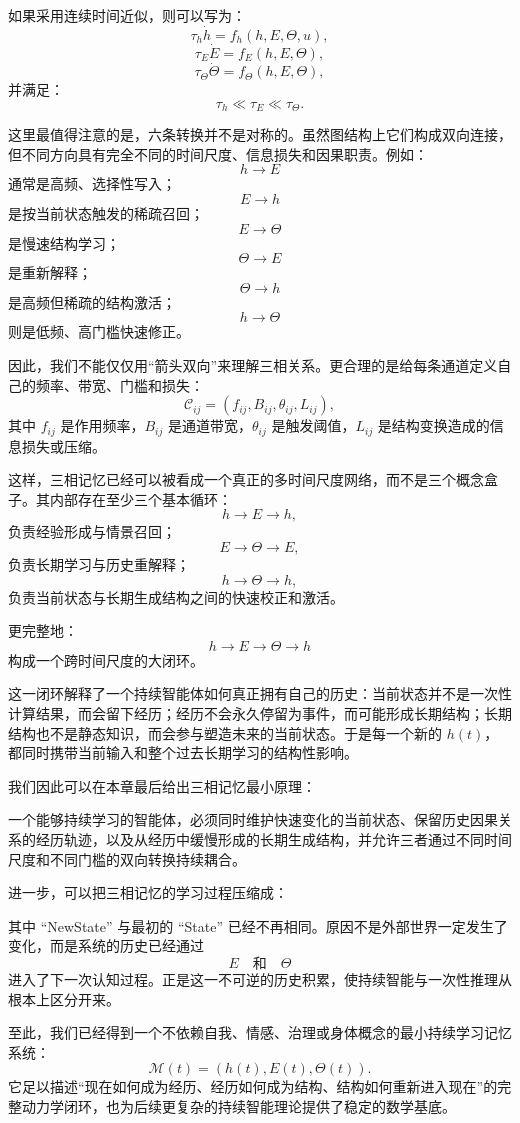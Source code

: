 如果采用连续时间近似，则可以写为：
\[
\tau_h\dot h
=
f_h(h,E,\Theta,u),
\]
\[
\tau_E\dot E
=
f_E(h,E,\Theta),
\]
\[
\tau_\Theta\dot\Theta
=
f_\Theta(h,E,\Theta),
\]
并满足：
\[
\boxed{
\tau_h\ll\tau_E\ll\tau_\Theta.
}
\]

这里最值得注意的是，六条转换并不是对称的。虽然图结构上它们构成双向连接，但不同方向具有完全不同的时间尺度、信息损失和因果职责。例如：
\[
h\rightarrow E
\]
通常是高频、选择性写入；
\[
E\rightarrow h
\]
是按当前状态触发的稀疏召回；
\[
E\rightarrow\Theta
\]
是慢速结构学习；
\[
\Theta\rightarrow E
\]
是重新解释；
\[
\Theta\rightarrow h
\]
是高频但稀疏的结构激活；
\[
h\rightarrow\Theta
\]
则是低频、高门槛快速修正。

因此，我们不能仅仅用“箭头双向”来理解三相关系。更合理的是给每条通道定义自己的频率、带宽、门槛和损失：
\[
\mathcal C_{ij}
=
\left(
f_{ij},
B_{ij},
\theta_{ij},
L_{ij}
\right),
\]
其中 $f_{ij}$ 是作用频率，$B_{ij}$ 是通道带宽，$\theta_{ij}$ 是触发阈值，$L_{ij}$ 是结构变换造成的信息损失或压缩。

这样，三相记忆已经可以被看成一个真正的多时间尺度网络，而不是三个概念盒子。其内部存在至少三个基本循环：
\[
h\rightarrow E\rightarrow h,
\]
负责经验形成与情景召回；
\[
E\rightarrow\Theta\rightarrow E,
\]
负责长期学习与历史重解释；
\[
h\rightarrow\Theta\rightarrow h,
\]
负责当前状态与长期生成结构之间的快速校正和激活。

更完整地：
\[
\boxed{
h
\rightarrow
E
\rightarrow
\Theta
\rightarrow
h
}
\]
构成一个跨时间尺度的大闭环。

这一闭环解释了一个持续智能体如何真正拥有自己的历史：当前状态并不是一次性计算结果，而会留下经历；经历不会永久停留为事件，而可能形成长期结构；长期结构也不是静态知识，而会参与塑造未来的当前状态。于是每一个新的 $h(t)$，都同时携带当前输入和整个过去长期学习的结构性影响。

我们因此可以在本章最后给出三相记忆最小原理：

\begin{statementbox}
一个能够持续学习的智能体，必须同时维护快速变化的当前状态、保留历史因果关系的经历轨迹，以及从经历中缓慢形成的长期生成结构，并允许三者通过不同时间尺度和不同门槛的双向转换持续耦合。
\end{statementbox}

进一步，可以把三相记忆的学习过程压缩成：
\begin{statementbox}
\centering
{}
\end{statementbox}

其中 ``NewState'' 与最初的 ``State'' 已经不再相同。原因不是外部世界一定发生了变化，而是系统的历史已经通过
\[
E
\quad\text{和}\quad
\Theta
\]
进入了下一次认知过程。正是这一不可逆的历史积累，使持续智能与一次性推理从根本上区分开来。

至此，我们已经得到一个不依赖自我、情感、治理或身体概念的最小持续学习记忆系统：
\[
\boxed{
\mathcal M(t)
=
(h(t),E(t),\Theta(t)).
}
\]
它足以描述“现在如何成为经历、经历如何成为结构、结构如何重新进入现在”的完整动力学闭环，也为后续更复杂的持续智能理论提供了稳定的数学基底。
